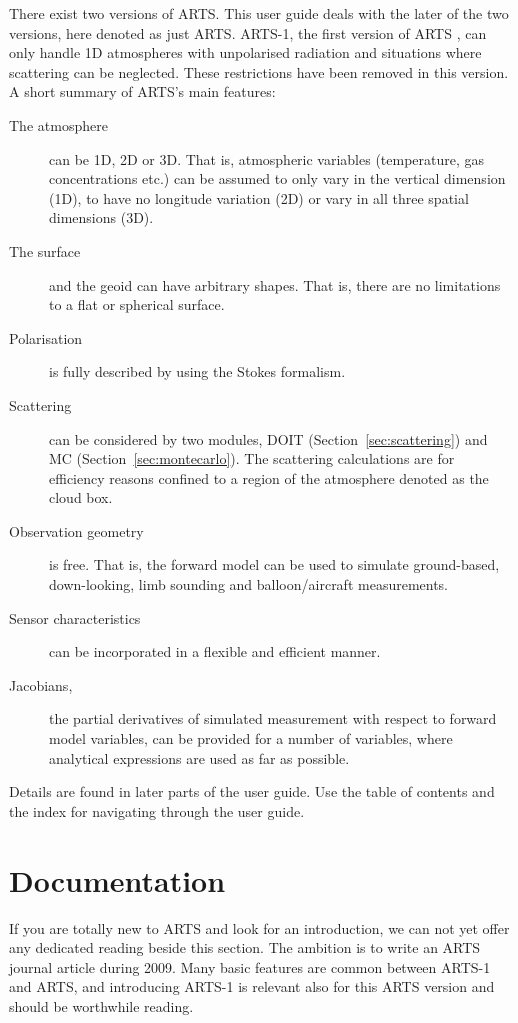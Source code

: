 There exist two versions of ARTS. This user guide deals with the later
of the two versions, here denoted as just ARTS. ARTS-1, the first
version of ARTS \citep{buehler:artst:05}, can only handle 1D
atmospheres with unpolarised radiation and situations where scattering
can be neglected. These restrictions have been removed in this
version. A short summary of ARTS's main features:
\begin{description}
\item[The atmosphere] can be 1D, 2D or 3D. That is, atmospheric
  variables (temperature, gas concentrations etc.) can be assumed to
  only vary in the vertical dimension (1D), to have no longitude
  variation (2D) or vary in all three spatial dimensions (3D).
\item[The surface] and the geoid can have arbitrary shapes. That is,
  there are no limitations to a flat or spherical surface.
\item[Polarisation] is fully described by using the Stokes formalism.
\item[Scattering] can be considered by two modules, DOIT
  (Section~\ref{sec:scattering}) and MC
  (Section~\ref{sec:montecarlo}). The scattering calculations are for
  efficiency reasons confined to a region of the atmosphere denoted as
  the cloud box.
\item[Observation geometry] is free. That is, the forward model can be
  used to simulate ground-based, down-looking, limb sounding and
  balloon/aircraft measurements.
\item[Sensor characteristics] can be incorporated in a flexible and
  efficient manner.
\item[Jacobians,] the partial derivatives of simulated measurement
  with respect to forward model variables, can be provided for a
  number of variables, where analytical expressions are used as far as
  possible.
\end{description}
Details are found in later parts of the user guide. Use the table of
contents and the index for navigating through the user guide.



\section{Documentation}
\label{sec:concept:doc}

If you are totally new to ARTS and look for an introduction, we can
not yet offer any dedicated reading beside this section. The ambition
is to write an ARTS journal article during 2009. Many basic features
are common between ARTS-1 and ARTS, and \citet{buehler:artst:05}
introducing ARTS-1 is relevant also for this ARTS version and should
be worthwhile reading.

